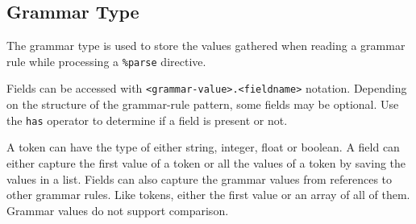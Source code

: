 
\subsection{Grammar Type}
{
	The grammar type is used to store the values
	gathered when reading a grammar rule while processing a \texttt{\%parse}
	directive.
	
	Fields can be accessed with \texttt{<grammar-value>.<fieldname>} notation.
	Depending on the structure of the grammar-rule pattern, some fields
	may be optional. Use the \texttt{has} operator to determine if a field
	is present or not.
	
	A token can have the type of either string, integer, float or boolean.
	A field can either capture the first value of a token or all the values
	of a token by saving the values in a list.
	Fields can also capture the grammar values from references to other
	grammar rules. Like tokens, either the first value or an array of all
	of them.
	Grammar values do not support comparison.
}

